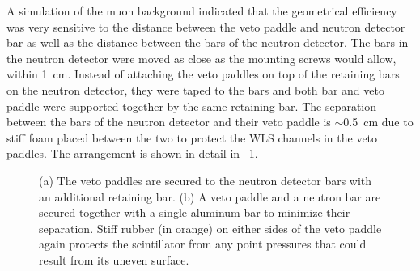 A simulation of the muon background indicated that the geometrical efficiency was very sensitive to the distance between the veto paddle and neutron detector bar as well as the distance between the bars of the neutron detector.   The bars in the neutron detector were moved as close as the mounting screws would allow, within 1~cm.  Instead of attaching the veto paddles on top of the retaining bars on the neutron detector, they were taped to the bars and both bar and veto paddle were supported together by the same retaining bar.  The separation between the bars of the neutron detector and their veto paddle is $\sim$0.5~cm due to stiff foam placed between the two to protect the WLS channels in the veto paddles.  The arrangement is shown in detail in {\fig}~\ref{fig:finalMount}.
\begin{figure}[!htbp]
\centering
{}
\caption[Initial veto setup.]{(a) The veto paddles are secured to the neutron detector bars with an additional retaining bar.  (b) A veto paddle and a neutron bar are secured together with a single aluminum bar to minimize their separation.  Stiff rubber (in orange) on either sides of the veto paddle again protects the scintillator from any point pressures that could result from its uneven surface.}
\label{fig:finalMount}
\end{figure}

